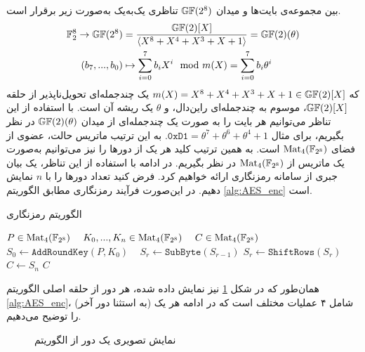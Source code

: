 بین مجموعه‌ی بایت‌ها و میدان 
$\mathbb{GF}(2^{8})$
تناظری یک‌به‌یک به‌صورت زیر برقرار است. 
\begin{align*}
\mathbb{F}_{2}^{8}\rightarrow \mathbb{GF}(2^{8}) &= \frac{\mathbb{GF}(2)[X]}{\langle X^{8} + X^{4} + X^{3} + X + 1\rangle} = \mathbb{GF}(2)(\theta)\\
(b_{7},...,b_{0})&\mapsto \sum_{i = 0}^{7}b_{i}X^{i}\mod m(X) = \sum_{i = 0}^{7}b_{i}\theta^{i}
\end{align*}
که 
$m(X) = X^{8} + X^{4} + X^{3} + X + 1\in \mathbb{GF}(2)[X]$
یک چندجمله‌ای تحویل‌ناپذیر از حلقه 
$\mathbb{GF}(2)[X]$، 
 موسوم به چندجمله‌ای راین‌دال، و 
 $\theta$
 یک ریشه آن است.  با استفاده از این تناظر می‌توانیم هر  بایت را به صورت یک چندجمله‌ای از میدان 
 $\mathbb{GF}(2)(\theta)$
  در نظر بگیریم، برای مثال 
$\texttt{0xD1} = \theta^{7} + \theta^{6} + \theta^{4} + 1$. 
  به این ترتیب  ماتریس حالت، عضوی از فضای 
$\operatorname{\mathrm{Mat}}_{4}(\mathbb{F}_{2^{8}})$
 است.  به همین ترتیب کلید هر یک از دورها را نیز می‌توانیم به‌صورت یک ماتریس از 
$\operatorname{\mathrm{Mat}}_{4}(\mathbb{F}_{2^{8}})$
در نظر بگیریم. در ادامه با استفاده از این تناظر، یک بیان جبری از سامانه رمزنگاری 
ارائه خواهیم کرد. فرض کنید تعداد دورها را با 
$n$
نمایش دهیم. در این‌صورت فرآیند رمزنگاری مطابق الگوریتم 
\ref{alg:AES_enc}
است. 
\begin{algorithm}
	\caption{الگوریتم رمزنگاری  
		}
		\label{alg:AES_enc}	
	\begin{latin}
		\begin{algorithmic}[]
			\REQUIRE  $P\in \operatorname{\mathrm{Mat}}_{4}(\mathbb{F}_{2^{8}})$ \ 
			\REQUIRE $K_{0},...,K_{n}\in \operatorname{\mathrm{Mat}}_{4}(\mathbb{F}_{2^{8}})$ \ 
			\ENSURE $C \in \operatorname{\mathrm{Mat}}_{4}(\mathbb{F}_{2^{8}})$
			\STATE $S_{0}\gets \texttt{AddRoundKey}(P, K_{0})$ \ 
			\STATE $S_{r}\gets \texttt{SubByte}(S_{r-1})$
			\STATE $S_{r}\gets \texttt{ShiftRows}(S_{r})$
			\ENDIF
			\ENDFOR
			\STATE $C \gets S_{n}$
			\RETURN $C$
		\end{algorithmic}
	\end{latin}
\end{algorithm}
همان‌طور که در شکل 
\ref{fig:AES_RoundFunction}
نیز نمایش داده شده، هر دور از حلقه اصلی  الگوریتم 
\ref{alg:AES_enc}، 
(به استثنا دور آخر) شامل ۴  عملیات مختلف است که در ادامه هر یک را توضیح می‌دهیم. 
\begin{figure}[h]
\begin{center}

\caption{نمایش تصویری یک دور از الگوریتم 
	}
\label{fig:AES_RoundFunction}
\end{center}
\end{figure}
